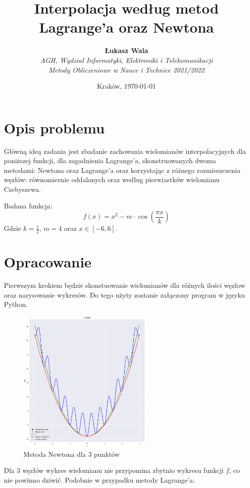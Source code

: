 \documentclass{article}
\title{Interpolacja według metod Lagrange'a oraz Newtona}
\author{\textbf{Łukasz Wala}\\
    \textit{AGH, Wydział Informatyki, Elektroniki i Telekomunikacji} \\
    \textit{Metody Obliczeniowe w Nauce i Technice 2021/2022}}
\date{Kraków, \today}
\begin{document}
\maketitle

\section{Opis problemu}
Główną ideą zadania jest zbadanie zachowania wielomianów interpolacyjnych dla poniższej funkcji, dla zagadnienia Lagrange'a, skonstruowanych dwoma metodami: Newtona oraz 
Lagrange'a oraz korzystając z różnego rozmieszczenia węzłów: równomiernie oddalonych oraz według pierwiastków wielomianu Czebyszewa.

Badana funkcja:
\[f(x)=x^2-m\cdot\cos\left(\frac{\pi x}{k}\right)\]
Gdzie $k=\frac{1}{2}$, $m=4$ oraz $x\in [-6,6]$.


\section{Opracowanie}
Pierwszym krokiem będzie skonstuowanie wielomianów dla różnych ilości węzłow oraz narysowanie wykresów. 
Do tego użyty zostanie załączony program w języku Python. 

\begin{figure}[H]
    \centering
    \includegraphics[width=0.6\textwidth]{img/newt_3.png}
    \caption{Metoda Newtona dla 3 punktów}
\end{figure}

Dla 3 węzłów wykres wielomianu nie przypomina zbytnio wykresu funkcji $f$, co nie powinno dziwić. Podobnie w przypadku metody Lagrange'a:
\end{document}
